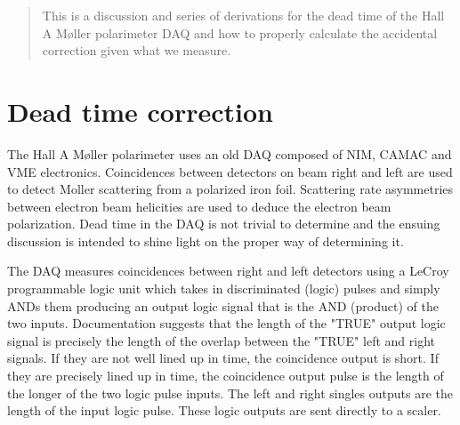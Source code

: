 \documentclass[12pt]{article}
\begin{document}
\maketitle

\begin{abstract}
This is a discussion and series of derivations for the dead time of the Hall A M\o ller polarimeter DAQ and how to properly calculate the accidental correction given what we measure.
\end{abstract}

\section{Dead time correction\label{sec:deadtime}}
The Hall A M\o ller polarimeter uses an old DAQ composed of NIM, CAMAC and VME electronics. Coincidences between detectors on beam right and left are used to detect Moller scattering from a polarized iron foil. Scattering rate asymmetries between electron beam helicities are used to deduce the electron beam polarization. Dead time in the DAQ is not trivial to determine and the ensuing discussion is intended to shine light on the proper way of determining it. 

The DAQ measures coincidences between right and left detectors using a LeCroy programmable logic unit which takes in discriminated (logic) pulses and simply ANDs them producing an output logic signal that is the AND (product) of the two inputs. Documentation suggests that the length of the "TRUE" output logic signal is precisely the length of the overlap between the "TRUE" left and right signals. If they are not well lined up in time, the coincidence output is short. If they are precisely lined up in time, the coincidence output pulse is the length of the longer of the two logic pulse inputs. The left and right singles outputs are the length of the input logic pulse. These logic outputs are sent directly to a scaler.
\end{document}
